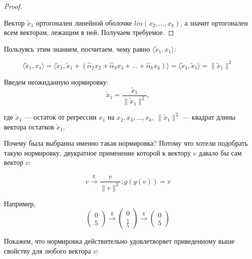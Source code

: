 \documentclass[12pt]{article} %
\theoremstyle{definition} %
\def \ha{\hat{\alpha}}
\def \tx{\tilde{x}}
\def \cx{\check{x}}
\begin{document}
\begin{proof}
\begin{center}
\end{center}

Вектор $\tx_1$ ортогонален линейной оболочке $lin \left(x_2, ..., x_k \right)$, а значит ортогонален всем векторам, лежащим в ней. Получаем требуемое.



\end{proof}

Пользуясь этим знанием, посчитаем, чему равно $\langle \tx_1, x_1 \rangle$:

\[
\langle \tx_1, x_1 \rangle = \langle \tx_1, \tx_1 + \left(\ha_2 x_2 + \ha_3 x_3 + \ldots + \ha_k x_k \right) \rangle = \langle \tx_1, \tx_1 \rangle = \| \tx_1 \|^2
\]

Введем неожиданную нормировку:
\[
\cx_1 = \frac{\tx_1}{\| \tx_1 \|^2},
\]

где $\tx_1$ — остаток от регрессии $x_1$ на $x_2, x_3, \dots, x_k$, $\| \tx_1 \|^2$ — квадрат длины вектора остатков $\tx_1$.


Почему была выбранна именно такая нормировка? Потому что хотели подобрать такую нормировку, двукратное применение которой к вектору $v$ давало бы сам вектор $v$:

\[
v \xrightarrow{\text{g}} \frac{v}{\| v \|^2};
g \left(g \left(v \right) \right) = v
\]

Например,
\[
\begin{pmatrix} 0 \\ 5 \end{pmatrix} \xrightarrow{\text{g}} \begin{pmatrix} 0 \\ \frac{1}{5} \end{pmatrix} \xrightarrow{\text{g}} \begin{pmatrix} 0 \\ 5 \end{pmatrix}
\]

Покажем, что нормировка действительно удовлетворяет приведенному выше свойству для любого вектора $v$:
\end{document}
